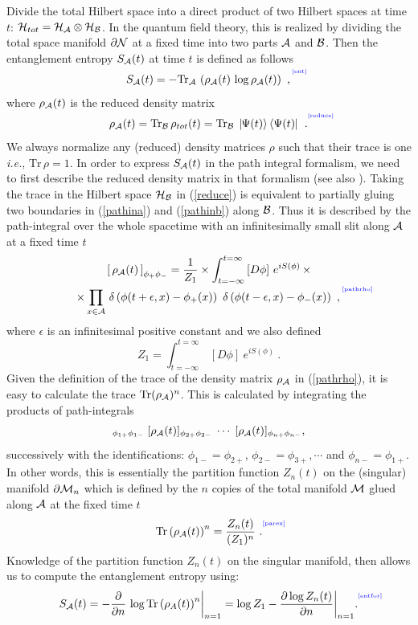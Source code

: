 \documentclass[12pt]{article}
\newcommand{\be}{\begin{equation}}
\newcommand{\ee}{\end{equation}}
\def\req#1{(\ref{#1})}
\def\[{\left [}
\def\]{\right ]}
\def\({\left (}
\def\){\right )}
\def\ie{{\it i.e.}}
\def\eps{\epsilon}
\def\p{\partial}
\def\CA{{\cal A}}
\def\CB{{\cal B}}
\def\CH{{\cal H}}
\def\p{\partial}
\def\p{\partial}
\def\ket#1{\mid  \! \! #1   \rangle}
\def\bra#1{\langle   #1 \! \! \mid}
\def\Label#1{\label{#1}%
{ \color{blue}{\smash{\hbox to0pt{\raise2ex\hbox{\tiny[#1]}\hss}}}}}
\def\bdy{\p{\cal M}}
\def\bdys{\p{\cal N}}
\def\rA{\CA}
\def\rB{\CB}
\begin{document}
Divide the total Hilbert space into a direct product of two Hilbert
spaces at time $t$: $\CH_{tot}=\CH_\rA\otimes \CH_\rB$.
 In the quantum field theory, this is realized by dividing the
  total space manifold $\bdys$ at a fixed time into two parts $\rA$ and $\rB$.
Then the entanglement entropy $S_\rA(t)$ at time $t$ is defined as follows
%
\begin{equation}
S_\rA(t)=-\mbox{Tr}_{\rA}\,\(\rho_\rA(t)\, \log\rho_\rA(t) \) \ ,
\Label{ent}
\end{equation}
%
where $\rho_\rA(t)$ is the reduced density matrix
%
\begin{equation}
\rho_\rA(t)=\mbox{Tr}_{\rB}\, \rho_{tot}(t)
=\mbox{Tr}_{\rB}\,\ket{\Psi(t)}\, \bra{\Psi(t)} \ . \Label{reduce}
\end{equation}
%
We always normalize any (reduced) density matrices $\rho$ such that
their trace is one \ie, $\mbox{Tr}\, \rho=1$. In order to express
$S_\rA(t)$ in the path integral formalism, we need to first describe
the reduced density matrix in that formalism (see also
\cite{Calabrese:2004eu, Calabrese:2005in, Fursaev:2006ng,
Ryu:2006ef}). Taking the trace in the Hilbert space $\CH_\rB$ in
(\ref{reduce}) is equivalent to partially gluing two boundaries in
(\ref{pathina}) and (\ref{pathinb}) along $\rB$. Thus it is
described by the path-integral over the whole spacetime with an
infinitesimally small slit along $\rA$ at a fixed time $t$
%
\begin{multline}
\[ \, \rho_\rA(t) \, \]_{\phi_+ \phi_-} = {1\over Z_1} \times \int
^{t=\infty}_{t=-\infty} \,[D\phi]~ e^{iS(\phi)}\, \times \\ 
\times \prod_{x\in
\rA}\, \delta\left(\phi(t+\eps,x)-\phi_+(x)\right)\, \,
\delta\left(\phi(t-\eps,x)-\phi_-(x)\right) \ ,
\Label{pathrho}
\end{multline}
%
 where
$\eps$ is an infinitesimal positive constant and we also defined
%
\be Z_1=\int ^{t=\infty}_{t=-\infty} \, [D\phi]~
e^{iS(\phi)} \ .\ee
%
Given the definition of the trace of the density matrix $\rho_\rA$ in \req{pathrho},
 it is easy to calculate the trace ${\rm Tr }(\rho_\rA)^n$. This
  is  calculated by integrating the products of path-integrals
%
\be
[\rho_\rA(t)]_{\phi_{1+} \phi_{1-}} \; [\rho_\rA(t)]_{\phi_{2+} \phi_{2-}}\; \cdots
\; [\rho_\rA(t)]_{\phi_{n+} \phi_{n-}},\ee
%
successively with the identifications:
$\phi_{1-}=\phi_{2+}$, $\phi_{2-}=\phi_{3+},\cdots$ and $\phi_{n-}=\phi_{1+}$.
 In other words, this is essentially the partition function $Z_n(t)$ on the
 (singular) manifold $\bdy_n$ which is
 defined by the $n$ copies of the total manifold ${\cal{M}}$ glued along $\rA$
at the fixed time $t$
%
\begin{equation}
\mbox{Tr}\(\rho_\rA(t)\)^n=\frac{Z_n(t)}{(Z_1)^n}  \ .
\Label{parex}
\end{equation}
%
Knowledge of the partition function $Z_n(t)$ on the singular
manifold, then allows us to compute the entanglement entropy using:
%
\begin{equation}
 S_\rA(t)=-\frac{\p}{\p n} \, \log \mbox{Tr}\(\rho_A(t)\)^n\biggr|_{n=1}= \log
Z_1-\frac{\p \log Z_n(t)}{\p n}\biggr|_{n=1}. \Label{entfor}
\end{equation}
%
\end{document}
